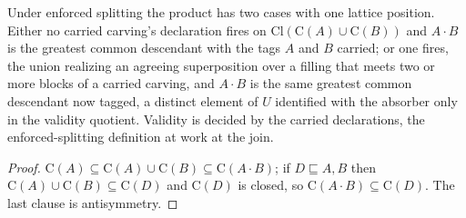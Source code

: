 \noindent Under enforced splitting the product has two cases with one lattice position. Either no carried carving's declaration fires on $\mathrm{Cl}(\mathrm{C}(A) \cup \mathrm{C}(B))$ and $A \cdot B$ is the greatest common descendant with the tags $A$ and $B$ carried; or one fires, the union realizing an agreeing superposition over a filling that meets two or more blocks of a carried carving, and $A \cdot B$ is the same greatest common descendant now tagged, a distinct element of $U$ identified with the absorber only in the validity quotient. Validity is decided by the carried declarations, the enforced-splitting definition at work at the join.
\begin{proof}
$\mathrm{C}(A) \subseteq \mathrm{C}(A) \cup \mathrm{C}(B) \subseteq \mathrm{C}(A \cdot B)$; if $D \sqsubseteq A, B$ then $\mathrm{C}(A) \cup \mathrm{C}(B) \subseteq \mathrm{C}(D)$ and $\mathrm{C}(D)$ is closed, so $\mathrm{C}(A \cdot B) \subseteq \mathrm{C}(D)$. The last clause is antisymmetry.
\end{proof}

